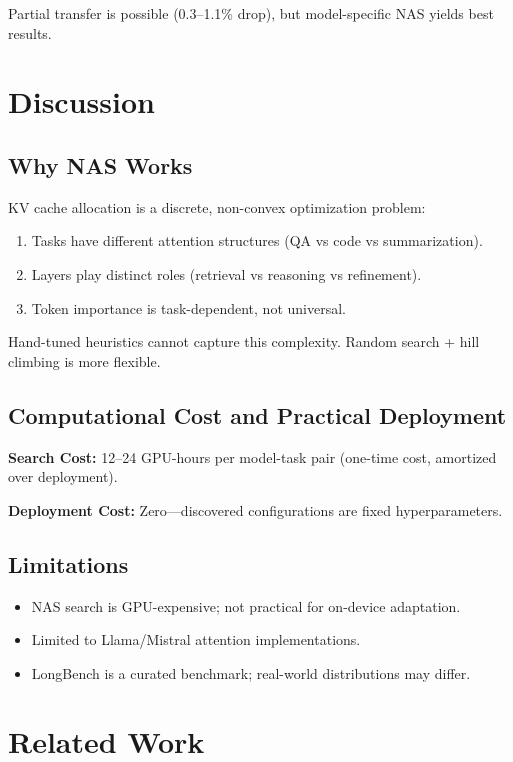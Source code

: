 \documentclass[11pt]{article}
\begin{document}
Partial transfer is possible (0.3–1.1\% drop), but model-specific NAS yields best results.

\section{Discussion}

\subsection{Why NAS Works}

KV cache allocation is a discrete, non-convex optimization problem:
\begin{enumerate}
    \item Tasks have different attention structures (QA vs code vs summarization).
    \item Layers play distinct roles (retrieval vs reasoning vs refinement).
    \item Token importance is task-dependent, not universal.
\end{enumerate}

Hand-tuned heuristics cannot capture this complexity. Random search + hill climbing is more flexible.

\subsection{Computational Cost and Practical Deployment}

\textbf{Search Cost:} 12–24 GPU-hours per model-task pair (one-time cost, amortized over deployment).

\textbf{Deployment Cost:} Zero—discovered configurations are fixed hyperparameters.

\subsection{Limitations}

\begin{itemize}
    \item NAS search is GPU-expensive; not practical for on-device adaptation.
    \item Limited to Llama/Mistral attention implementations.
    \item LongBench is a curated benchmark; real-world distributions may differ.
\end{itemize}

\section{Related Work}
\end{document}
